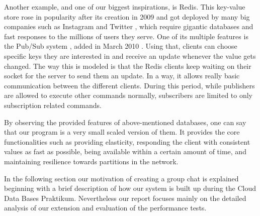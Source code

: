 Another example, and one of our biggest inspirations, is Redis. This key-value store rose in popularity after its creation in 2009 and got deployed by many big companies such as Instagram \cite{krieger2011instagram} and Twitter \cite{yu2014twitter}, which require gigantic databases and fast responses to the millions of users they serve. One of its multiple features is the Pub/Sub system \cite{redis2020pubsub}, added in March 2010 \cite{sanfilippo2010pubsub}. Using that, clients can choose specific keys they are interested in and receive an update whenever the value gets changed. The way this is modeled is that the Redis clients keep waiting on their socket for the server to send them an update. In a way, it allows really basic communication between the different clients.
During this period, while publishers are allowed to execute other commands normally, subscribers are limited to only subscription related commands.



By observing the provided features of above-mentioned databases, one can say that our program is a very small scaled version of them. It provides the core functionalities such as providing elasticity, responding the client with consistent values as fast as possible, being available within a certain amount of time, and maintaining resilience towards partitions in the network.
 
In the following section our motivation of creating a group chat is explained beginning with a brief description of how our system is built up during the Cloud Data Bases Praktikum. Nevertheless our report focuses mainly on the detailed analysis of our extension and evaluation of the performance tests.
